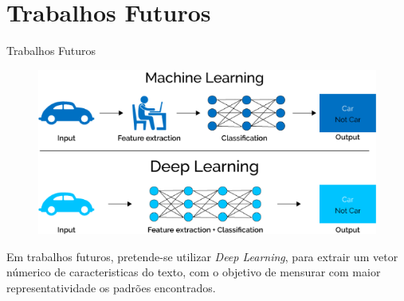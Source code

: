 \section{Trabalhos Futuros}
    \begin{frame}[fragile]{Trabalhos Futuros}
        \begin{figure}[H]
            \begin{center}
                \includegraphics[scale=0.50]{images/deep_learning.png}
            \end{center}
        \end{figure}
      Em trabalhos futuros, pretende-se utilizar \textit{Deep Learning}, para 
      extrair um vetor númerico de caracteristicas do texto, com o objetivo de 
      mensurar com maior representatividade os padrões encontrados.
  \end{frame}